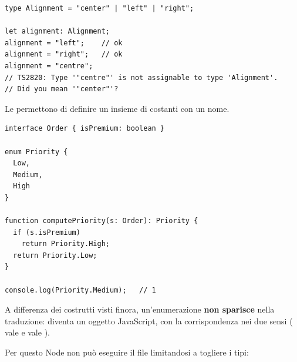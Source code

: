 \begin{lstlisting}[style=ts, name=literals2.ts]
type Alignment = "center" | "left" | "right";

let alignment: Alignment;
alignment = "left";    // ok
alignment = "right";   // ok
alignment = "centre";
// TS2820: Type '"centre"' is not assignable to type 'Alignment'.
// Did you mean '"center"'?
\end{lstlisting}

Le  permettono di definire un insieme di costanti con un
nome.

\begin{affianco}[0.55][c]
\begin{lstlisting}[style=ts, name=enums.ts]
interface Order { isPremium: boolean }

enum Priority {
  Low,
  Medium,
  High
}

function computePriority(s: Order): Priority {
  if (s.isPremium)
    return Priority.High;
  return Priority.Low;
}

console.log(Priority.Medium);   // 1
\end{lstlisting}
\risultato
\begin{immagine}
\end{immagine}
\end{affianco}

A differenza dei costrutti visti finora, un'enumerazione \textbf{non sparisce}
nella traduzione: diventa un oggetto JavaScript, con la corrispondenza nei due
sensi ( vale  e  vale
).


Per questo Node non può eseguire il file limitandosi a togliere i tipi:

